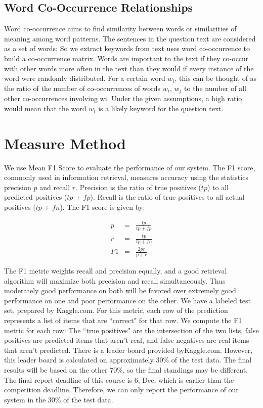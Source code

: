\documentclass[11pt]{article} %
\begin{document}
\subsection{Word Co-Occurrence Relationships}
Word co-occurrence aims to find similarity between words or similarities of meaning among word patterns. The sentences in the question text are considered as a set of words; So we extract keywords from text uses word co-occurrence to build a co-occurrence matrix. Words are important to the text if they co-occur with other words more often in the text than they would if every instance of the word were randomly distributed. For a certain word $w_i$, this can be thought of as the ratio of the number of co-occurrences of words $w_i$, $w_j$ to the number of all other co-occurrences involving wi. Under the given assumptions, a high ratio would mean that the word $w_i$ is a likely keyword for the question text.

\section{Measure Method}
We use Mean F1 Score to evaluate the performance of our system. The F1 score, commonly used in information retrieval, measures accuracy using the statistics precision $p$ and recall $r$. Precision is the ratio of true positives ($tp$) to all predicted positives ($tp$ + $fp$). Recall is the ratio of true positives to all actual positives ($tp$ + $fn$). The F1 score is given by:

\begin{eqnarray}
 p & = & \frac{tp}{tp+fp}\\
 r & = & \frac{tp}{tp+fn}\\
 F1 & = & \frac{2pr}{p+r}
\end{eqnarray}

The F1 metric weights recall and precision equally, and a good retrieval algorithm will maximize both precision and recall simultaneously. Thus moderately good performance on both will be favored over extremely good performance on one and poor performance on the other.
We have a labeled test set, prepared by Kaggle.com. For this metric, each row of the prediction represents a list of items that are ``correct" for that row. We compute the F1 metric for each row: The ``true positives" are the intersection of the two lists, false positives are predicted items that aren't real, and false negatives are real items that aren't predicted.
There is a leader board provided byKaggle.com. However, this leader board is calculated on approximately 30\% of the test data. The final results will be based on the other 70\%, so the final standings may be different. The final report deadline of this course is 6, Dec, which is earlier than the competition deadline. Therefore, we can only report the performance of our system in the 30\% of the test data.
\end{document}
